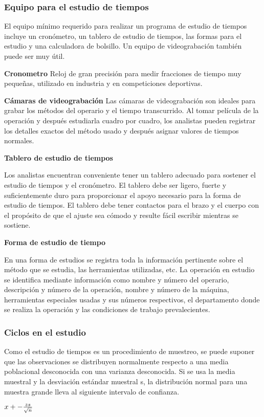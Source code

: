 \subsubsection{Equipo para el estudio de tiempos}

El equipo mínimo requerido para realizar un programa de estudio de tiempos incluye un cronómetro, un tablero de estudio de tiempos, las formas para el estudio y una calculadora de bolsillo. Un equipo de videograbación también puede ser muy útil.

\textbf{Cronometro}
Reloj de gran precisión para medir fracciones de tiempo muy pequeñas, utilizado en industria y en competiciones deportivas.
\cite{RAE}

\textbf{Cámaras de videograbación}
Las cámaras de videograbación son ideales para grabar los métodos del operario y el tiempo transcurrido. Al tomar película de la operación y después estudiarla cuadro por cuadro, los analistas pueden registrar los detalles exactos del método usado y después asignar valores de tiempos normales. 

\textbf{Tablero de estudio de tiempos}

Los analistas encuentran conveniente tener un tablero adecuado para sostener el estudio de tiempos y el cronómetro. El tablero debe ser ligero, fuerte y suficientemente duro para proporcionar el apoyo necesario para la forma de estudio de tiempos. El tablero debe tener contactos para el brazo y el cuerpo con el propósito de que el ajuste sea cómodo y resulte fácil escribir mientras se sostiene.

\textbf{Forma de estudio de tiempo}

En una forma de estudios se registra toda la información pertinente sobre el método que se estudia, las herramientas utilizadas, etc. La operación en estudio se identifica mediante información como nombre y número del operario, descripción y número de la operación, nombre y número de la máquina, herramientas especiales usadas y sus números respectivos, el departamento donde se realiza la operación y las condiciones de trabajo prevalecientes. 
\cite{niebel1980ingenieria}

\subsubsection{Ciclos en el estudio}
 Como el estudio de tiempos es un procedimiento de muestreo, se puede suponer que las observaciones se distribuyen normalmente respecto a una media poblacional desconocida con una varianza desconocida. Si se usa la media muestral y la desviación estándar muestral s, la distribución normal para una muestra grande lleva al siguiente intervalo de confianza.

${\-x}+-{\frac{zs}{\sqrt{n}}}$
\cite{niebel1980ingenieria}




